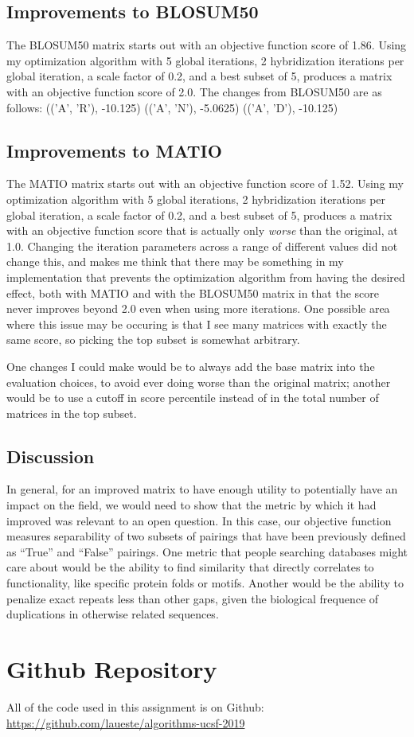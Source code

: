 \documentclass{article}
\begin{document}
\subsection{Improvements to BLOSUM50}
The BLOSUM50 matrix starts out with an objective function score of 1.86. Using my optimization algorithm 
with 5 global iterations, 2 hybridization iterations per global iteration, a scale factor of 0.2, and a best subset of 5, produces a matrix with an objective function score of 2.0. The changes from BLOSUM50 are as follows:
(('A', 'R'), -10.125)
(('A', 'N'), -5.0625)
(('A', 'D'), -10.125) 


\subsection{Improvements to MATIO}
The MATIO matrix starts out with an objective function score of 1.52. Using my optimization algorithm 
with 5 global iterations, 2 hybridization iterations per global iteration, a scale factor of 0.2, and a best subset of 5, produces a matrix with an objective function score that is actually only {\it worse} than the original, at 1.0. Changing the iteration parameters across a range of different values did not change this, and makes me think that there may be something in my implementation that prevents the optimization algorithm from having the desired effect, both with MATIO and with the BLOSUM50 matrix in that the score never improves beyond 2.0 even when using more iterations. One possible area where this issue may be occuring is that I see many matrices with exactly the same score, so picking the top subset is somewhat arbitrary.
\par One changes I could make would be to always add the base matrix into the evaluation choices, to avoid ever doing worse than the original matrix; another would be to use a cutoff in score percentile instead of in the total number of matrices in the top subset. 

\subsection{Discussion}
In general, for an improved matrix to have enough utility to potentially have an impact on the field, we would need to show that the metric by which it had improved was relevant to an open question. In this case, our objective function measures separability of two subsets of pairings that have been previously defined as ``True'' and ``False'' pairings. One metric that people searching databases might care about would be the ability to find similarity that directly correlates to functionality, like specific protein folds or motifs. Another would be the ability to penalize exact repeats less than other gaps, given the biological frequence of duplications in otherwise related sequences. 


\section{Github Repository}
All of the code used in this assignment is on Github: \url{https://github.com/laueste/algorithms-ucsf-2019}
\end{document}
